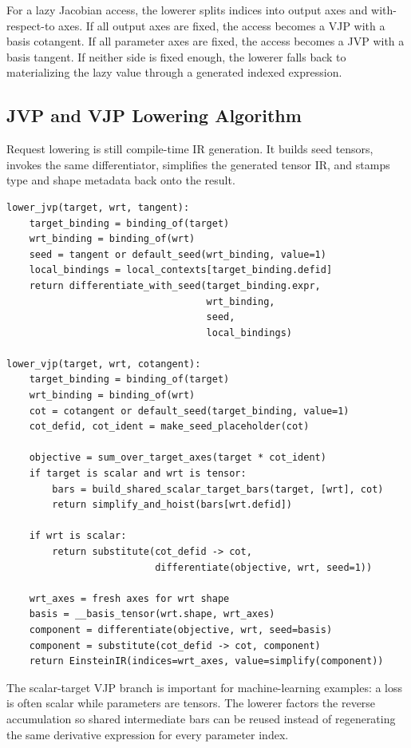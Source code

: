 For a lazy Jacobian access, the lowerer splits indices into output axes and
with-respect-to axes. If all output axes are fixed, the access becomes a VJP
with a basis cotangent. If all parameter axes are fixed, the access becomes a
JVP with a basis tangent. If neither side is fixed enough, the lowerer falls
back to materializing the lazy value through a generated indexed expression.

\subsection{JVP and VJP Lowering Algorithm}

Request lowering is still compile-time IR generation. It builds seed tensors,
invokes the same differentiator, simplifies the generated tensor IR, and stamps
type and shape metadata back onto the result.

\begin{lstlisting}[style=pythoncode,caption={Plain IR lowering for JVP and VJP requests.}]
lower_jvp(target, wrt, tangent):
    target_binding = binding_of(target)
    wrt_binding = binding_of(wrt)
    seed = tangent or default_seed(wrt_binding, value=1)
    local_bindings = local_contexts[target_binding.defid]
    return differentiate_with_seed(target_binding.expr,
                                   wrt_binding,
                                   seed,
                                   local_bindings)

lower_vjp(target, wrt, cotangent):
    target_binding = binding_of(target)
    wrt_binding = binding_of(wrt)
    cot = cotangent or default_seed(target_binding, value=1)
    cot_defid, cot_ident = make_seed_placeholder(cot)

    objective = sum_over_target_axes(target * cot_ident)
    if target is scalar and wrt is tensor:
        bars = build_shared_scalar_target_bars(target, [wrt], cot)
        return simplify_and_hoist(bars[wrt.defid])

    if wrt is scalar:
        return substitute(cot_defid -> cot,
                          differentiate(objective, wrt, seed=1))

    wrt_axes = fresh axes for wrt shape
    basis = __basis_tensor(wrt.shape, wrt_axes)
    component = differentiate(objective, wrt, seed=basis)
    component = substitute(cot_defid -> cot, component)
    return EinsteinIR(indices=wrt_axes, value=simplify(component))
\end{lstlisting}

The scalar-target VJP branch is important for machine-learning examples: a loss
is often scalar while parameters are tensors. The lowerer factors the reverse
accumulation so shared intermediate bars can be reused instead of regenerating
the same derivative expression for every parameter index.

